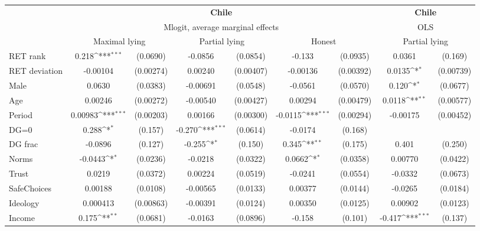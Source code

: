 \def\sym#1{\ifmmode^{#1}\else\(^{#1}\)\fi}
\begin{tabular}{l|cccccc|cc}
\hline\hline
&\multicolumn{6}{c|}{\bf Chile}&\multicolumn{2}{c}{\bf Chile}\\ &\multicolumn{6}{c|}{Mlogit, average marginal effects }&\multicolumn{2}{c}{OLS}\\
                &\multicolumn{2}{c}{Maximal lying}&\multicolumn{2}{c}{Partial lying}&\multicolumn{2}{c|}{Honest}  &\multicolumn{2}{c}{Partial lying}\\
\hline
RET rank        &    0.218\sym{***}& (0.0690)&  -0.0856         & (0.0854)&   -0.133         & (0.0935)&   0.0361         &  (0.169)\\
RET deviation   & -0.00104         &(0.00274)&  0.00240         &(0.00407)& -0.00136         &(0.00392)&   0.0135\sym{*}  &(0.00739)\\
Male            &   0.0630         & (0.0383)& -0.00691         & (0.0548)&  -0.0561         & (0.0570)&    0.120\sym{*}  & (0.0677)\\
Age             &  0.00246         &(0.00272)& -0.00540         &(0.00427)&  0.00294         &(0.00479)&   0.0118\sym{**} &(0.00577)\\
Period          &  0.00983\sym{***}&(0.00203)&  0.00166         &(0.00300)&  -0.0115\sym{***}&(0.00294)& -0.00175         &(0.00452)\\
DG=0          &    0.288\sym{*}  &  (0.157)&   -0.270\sym{***}& (0.0614)&  -0.0174         &  (0.168)&                  &         \\
DG frac         &  -0.0896         &  (0.127)&   -0.255\sym{*}  &  (0.150)&    0.345\sym{**} &  (0.175)&    0.401         &  (0.250)\\
Norms           &  -0.0443\sym{*}  & (0.0236)&  -0.0218         & (0.0322)&   0.0662\sym{*}  & (0.0358)&  0.00770         & (0.0422)\\
Trust         &   0.0219         & (0.0372)&  0.00224         & (0.0519)&  -0.0241         & (0.0554)&  -0.0332         & (0.0673)\\
SafeChoices     &  0.00188         & (0.0108)& -0.00565         & (0.0133)&  0.00377         & (0.0144)&  -0.0265         & (0.0184)\\
Ideology        & 0.000413         &(0.00863)& -0.00391         & (0.0124)&  0.00350         & (0.0125)&  0.00902         & (0.0123)\\
Income          &    0.175\sym{**} & (0.0681)&  -0.0163         & (0.0896)&   -0.158         &  (0.101)&   -0.417\sym{***}&  (0.137)\\

\end{tabular}
